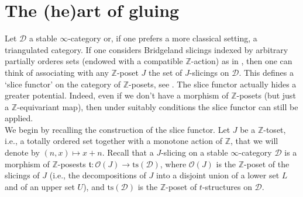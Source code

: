 \documentclass{article}
\theoremstyle{definition}
\newcommand{\Z}{\mathbb{Z}}
\newcommand{\Oo}{\mathcal{O}}
\newcommand{\ts}{\mathrm{ts}}
\newcommand{\tee}{\mathfrak{t}}
\begin{document}
\section{The (he)art of gluing} 

Let $\mathscr{D}$ a stable $\infty$-category or, if one prefers a more classical setting, a triangulated category.
If one considers Bridgeland slicings indexed by arbitrary partially orderes sets (endowed with a compatible $\Z$-action) as in \cite{i-russi}, then one can think of associating with any $\Z$-poset $J$ the set of $J$-slicings on $\mathscr{D}$. This defines a `slice functor' on the category of $\Z$-posets,
see \cite[Remark 3.12]{articolo-con-fosco}. The slice functor actually hides a greater potential. Indeed, even if we don't have a morphism of $\mathbb{Z}$-posets (but just a $\mathbb{Z}$-equivariant map), then under suitably conditions the slice functor can still be applied. \\

We begin by recalling the construction of the slice functor.
Let $J$ be a $\Z$-toset, i.e., a totally ordered set together with a monotone action of $\Z$, that we will denote by $(n,x)\mapsto x+n$. Recall that a $J$-slicing on a stable $\infty$-category $\mathscr{D}$ is a morphism of $\Z$-posests $\tee\colon \Oo(J)\to \ts(\mathscr{D})$, where $\Oo(J)$ is the $\Z$-poset of the slicings of $J$ (i.e., the decompositions of $J$ into a disjoint union of a lower set $L$ and of an upper set $U$), and $\ts(\mathscr{D})$ is the $\Z$-poset of $t$-structures on $\mathscr{D}$.
\end{document}
